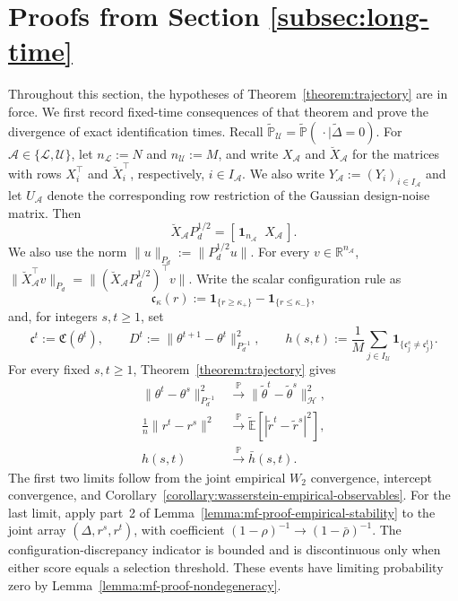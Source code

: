 \section{Proofs from Section \ref{subsec:long-time}}
\label{sec:proof-long-time}

Throughout this section, the hypotheses of
Theorem~\ref{theorem:trajectory} are in force.
We first record fixed-time consequences of that theorem and prove
the divergence of exact identification times.
Recall
$\tilde{\mathbb P}_{\mathcal U}
=\tilde{\mathbb P}(\,\cdot\mid\tilde\Delta=0)$.
For $\mathcal A\in\{\mathcal L,\mathcal U\}$, let 
$n_{\mathcal L}:=N$ and $n_{\mathcal U}:=M$, and write
$X_{\mathcal A}$ and $\breve X_{\mathcal A}$ for the matrices
with rows $X_i^\top$ and $\breve X_i^\top$, respectively,
$i\in I_{\mathcal A}$. We also
write $Y_{\mathcal A}:=(Y_i)_{i\in I_{\mathcal A}}$ and let
$U_{\mathcal A}$ denote the corresponding row restriction
of the Gaussian design-noise matrix. Then
\[
    \breve X_{\mathcal A}P_d^{1/2}
    =[\,\mathbf1_{n_{\mathcal A}}\;\;X_{\mathcal A}\,].
\]
We also use the norm
$\|u\|_{P_d}:=\|P_d^{1/2}u\|$.
For every $v\in\mathbb R^{n_{\mathcal A}}$,
\(
    \|\breve X_{\mathcal A}^{\top}v\|_{P_d}
    =
    \|(\breve X_{\mathcal A}P_d^{1/2})^\top v\|
\).
Write the scalar configuration rule as
\[
    \mathfrak c_\kappa(r)
    :=
    \mathbf1_{\{r\geq\kappa_+\}}
    -
    \mathbf1_{\{r\leq\kappa_-\}},
\]
and, for integers $s,t\geq1$, set
\[
    \mathfrak c^t:=\mathfrak C(\theta^t),
    \qquad
    D^t:=\|\theta^{t+1}-\theta^t\|_{P_d^{-1}}^2,
    \qquad
    h(s,t):=\frac1M\sum_{j\in I_{\mathcal U}}
        \mathbf1_{\{\mathfrak c_j^s\neq\mathfrak c_j^t\}}.
\]
For every fixed $s,t\geq1$,
Theorem~\ref{theorem:trajectory} gives
\begin{align}
    \|\theta^t-\theta^s\|_{P_d^{-1}}^2
    &\xrightarrow{\mathbb P}
    \|\tilde\theta^t-\tilde\theta^s\|_{\mathcal H}^2,
    \label{eq:long-time-parameter-distance-limit}\\
    \frac1n\|r^t-r^s\|^2
    &\xrightarrow{\mathbb P}
    \tilde{\mathbb E}
        [|\tilde r^t-\tilde r^s|^2],
    \label{eq:long-time-score-distance-limit}\\
    h(s,t)&\xrightarrow{\mathbb P}\bar h(s,t).
    \label{eq:long-time-configuration-limit}
\end{align}
The first two limits follow from the joint empirical
$W_2$ convergence, intercept convergence, and
Corollary~\ref{corollary:wasserstein-empirical-observables}.
For the last limit, apply part~2 of
Lemma~\ref{lemma:mf-proof-empirical-stability}
to the joint array $(\Delta,r^s,r^t)$, with coefficient
$(1-\rho)^{-1}\to(1-\bar\rho)^{-1}$.
The configuration-discrepancy indicator is bounded and
is discontinuous only when either score equals a selection
threshold. These events have limiting probability zero by
Lemma~\ref{lemma:mf-proof-nondegeneracy}.

